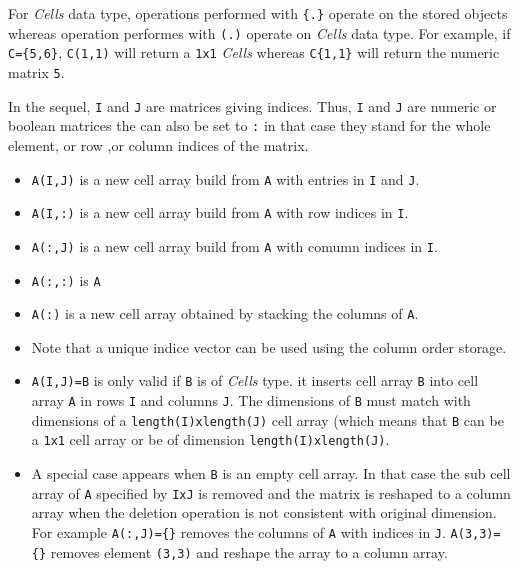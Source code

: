 For \emph{Cells} data type, operations performed with \verb+{.}+ operate on the stored objects whereas 
operation performes with \verb+(.)+ operate on \emph{Cells} data type. For example, if \verb+C={5,6}+, 
\verb+C(1,1)+ will return a \verb+1x1+ \emph{Cells} whereas  \verb+C{1,1}+ will return the numeric matrix \verb+5+. 

In the sequel, \verb+I+ and \verb+J+ are matrices giving indices. Thus, \verb+I+ and \verb+J+ are 
numeric or boolean matrices the can also be set to \verb+:+ in that case they stand for the whole 
element, or row ,or column indices of the matrix. 

\begin{itemize}
\item \verb+A(I,J)+ is a new cell array build from \verb+A+ with entries in \verb+I+ and \verb+J+. 
\item \verb+A(I,:)+ is a new cell array build from \verb+A+ with row indices in \verb+I+.
\item \verb+A(:,J)+ is a new cell array build from \verb+A+ with comumn indices in \verb+I+.
\item \verb+A(:,:)+ is \verb+A+
\item \verb+A(:)+ is a new cell array obtained by stacking the columns of \verb+A+.
\item Note that a unique indice vector can be used using the column order storage.
\end{itemize}

\begin{itemize}
\item \verb+A(I,J)=B+ is only valid if \verb+B+ is of \emph{Cells} type. 
  it inserts cell array \verb+B+ into cell array \verb+A+ in rows \verb+I+ and columns \verb!J!.
  The dimensions of \verb!B! must match with dimensions of a \verb+length(I)xlength(J)+ cell array 
  (which means that \verb!B! can be a \verb!1x1! cell array or be of dimension \verb+length(I)xlength(J)+. 
\item A special case appears when \verb!B! is an empty cell array. In that case the sub cell array of 
  \verb!A! specified by \verb+IxJ+ is removed and the matrix is reshaped to a column array when the deletion 
  operation is not consistent with original dimension. For example \verb+A(:,J)={}+ removes the columns 
  of \verb+A+ with indices in \verb+J+. \verb!A(3,3)={}! removes element \verb!(3,3)! and reshape
  the array to a column array.
\end{itemize}

